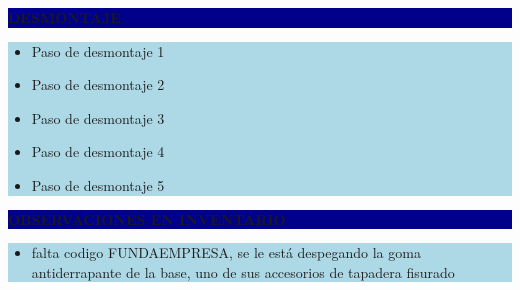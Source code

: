 \documentclass[11pt]{article}
\newcommand{\seccionbanda}[1]{%
  \vspace{0.6em}
  \noindent\colorbox{darkblue}{\parbox{\dimexpr\linewidth-2\fboxsep}{%
    \centering\color{white}\bfseries #1}}\par\vspace{0.6em}
}
\begin{document}
\seccionbanda{DESMONTAJE}
\noindent\colorbox{lightblue}{\parbox{\dimexpr\linewidth-2\fboxsep\relax}{%
\begin{itemize}[label=$\square$, itemsep=4pt]
\item Paso de desmontaje 1
\item Paso de desmontaje 2
\item Paso de desmontaje 3
\item Paso de desmontaje 4
\item Paso de desmontaje 5
\end{itemize}
}}\par
\seccionbanda{OBSERVACIONES EN INVENTARIO}
\noindent\colorbox{lightblue}{\parbox{\dimexpr\linewidth-2\fboxsep\relax}{\begin{itemize}[itemsep=4pt]
\item falta codigo FUNDAEMPRESA, se le está despegando la goma antiderrapante de la base, uno de sus accesorios de tapadera fisurado
\end{itemize}}}\par
\end{document}
